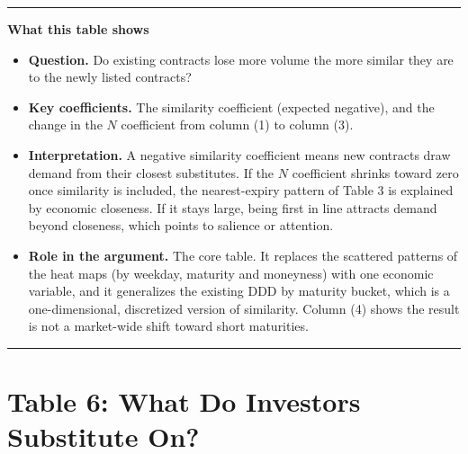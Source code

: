 \documentclass[11pt]{article}
\newenvironment{tableshows}
  {\begin{center}\begin{minipage}{0.95\textwidth}\small
   \hrule\vspace{4pt}
   \textbf{What this table shows}\par
   \begin{itemize}[leftmargin=12pt,topsep=4pt,itemsep=4pt,parsep=0pt]}
  {\end{itemize}\vspace{2pt}\hrule\end{minipage}\end{center}}
\begin{document}
\begin{tableshows}
\item \textbf{Question.} Do existing contracts lose more volume the more similar they are to the newly listed contracts?
\item \textbf{Key coefficients.} The similarity coefficient (expected negative), and the change in the $N$ coefficient from column (1) to column (3).
\item \textbf{Interpretation.} A negative similarity coefficient means new contracts draw demand from their closest substitutes. If the $N$ coefficient shrinks toward zero once similarity is included, the nearest-expiry pattern of Table 3 is explained by economic closeness. If it stays large, being first in line attracts demand beyond closeness, which points to salience or attention.
\item \textbf{Role in the argument.} The core table. It replaces the scattered patterns of the heat maps (by weekday, maturity and moneyness) with one economic variable, and it generalizes the existing DDD by maturity bucket, which is a one-dimensional, discretized version of similarity. Column (4) shows the result is not a market-wide shift toward short maturities.
\end{tableshows}

\clearpage
\section*{Table 6: What Do Investors Substitute On?}
\end{document}
